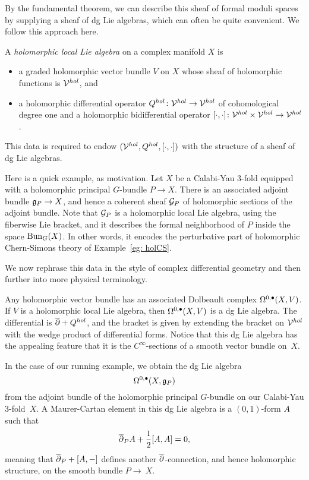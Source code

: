 \documentclass[11pt]{amsart}
\begin{document}
By the fundamental theorem, we can describe this sheaf of formal moduli spaces by supplying a sheaf of dg Lie algebras, which can often be quite convenient.
We follow this approach here.

\begin{dfn} 
A {\em holomorphic local Lie algebra} on a complex manifold $X$ is
\begin{itemize}
\item a graded holomorphic vector bundle $V$ on $X$ whose sheaf of holomorphic functions is $\mathcal V^{hol}$, and
\item a holomorphic differential operator $Q^{hol} \colon \mathcal V^{hol} \to \mathcal V^{hol}$ of cohomological degree one and a holomorphic bidifferential operator $[\cdot,\cdot] \colon \mathcal V^{hol} \times \mathcal V^{hol} \to \mathcal V^{hol}$. 
\end{itemize}
This data is required to endow $(\mathcal V^{hol}, Q^{hol}, [\cdot,\cdot])$ with the structure of a sheaf of dg Lie algebras.
\end{dfn}

Here is a quick example, as motivation.
Let $X$ be a Calabi-Yau 3-fold equipped with a holomorphic principal $G$-bundle $P \to X$.
There is an associated adjoint bundle $\mathfrak g_P \to X$, and hence a coherent sheaf $\mathcal G_P$ of holomorphic sections of the adjoint bundle.
Note that $\mathcal G_P$ is a holomorphic local Lie algebra, using the fiberwise Lie bracket,
and it describes the formal neighborhood of $P$ inside the space ${\rm Bun}_G(X)$.
In other words, it encodes the perturbative part of holomorphic Chern-Simons theory of Example~\ref{eg: holCS}.

We now rephrase this data in the style of complex differential geometry and then further into more physical terminology.

Any holomorphic vector bundle has an associated Dolbeault complex $\Omega^{0,\bullet}(X,V)$. 
If $V$ is a holomorphic local Lie algebra, 
then $\Omega^{0,\bullet}(X, V)$ is a dg Lie algebra. 
The differential is ${\overline{\partial}} + Q^{hol}$, 
and the bracket is given by extending the bracket on $\mathcal V^{hol}$ with the wedge product of differential forms. 
Notice that this dg Lie algebra has the appealing feature that it is the $C^\infty$-sections of a smooth vector bundle on~$X$.

In the case of our running example, we obtain the dg Lie algebra
\[
\Omega^{0,\bullet}(X,\mathfrak g_P)
\]
from the adjoint bundle of the holomorphic principal $G$-bundle on our Calabi-Yau 3-fold~$X$.
A Maurer-Cartan element in this dg Lie algebra is a $(0,1)$-form $A$ such that
\[
{\overline{\partial}}_P A + \frac{1}{2}[A,A] = 0,
\]
meaning that ${\overline{\partial}}_P + [A,-]$ defines another ${\overline{\partial}}$-connection, and hence holomorphic structure, on the smooth bundle $P \to~X$.
\end{document}
